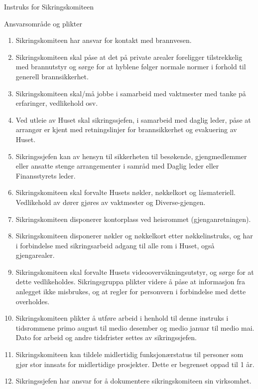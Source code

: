 \begin{instruks}{Instruks for Sikringskomiteen}{}{}
\begin{instruksledd}{Ansvarsområde og plikter}
\begin{enumerate}
            \item Sikringskomiteen har ansvar for kontakt med brannvesen.
            \item Sikringskomiteen skal påse at det på private arealer foreligger
                tilstrekkelig med brannutstyr og sørge for at
                hyblene følger normale normer i forhold til generell brannsikkerhet.
            \item Sikringskomiteen skal/må jobbe i samarbeid med vaktmester med tanke på
                erfaringer, vedlikehold osv.
            \item Ved utleie av Huset skal sikringssjefen, i samarbeid med daglig leder,
                påse at arrangør er kjent med
                retningslinjer for brannsikkerhet og evakuering av Huset.
            \item Sikringssjefen kan av hensyn til sikkerheten til besøkende,
                gjengmedlemmer eller ansatte stenge
                arrangementer i samråd med Daglig leder eller Finansstyrets leder.
            \item Sikringskomiteen skal forvalte Husets nøkler, nøkkelkort og låsmateriell.
                Vedlikehold av dører gjøres av
                vaktmester og Diverse-gjengen.
            \item Sikringskomiteen disponerer kontorplass ved heisrommet
                (gjenganretningen).
            \item Sikringskomiteen disponerer nøkler og nøkkelkort etter nøkkelinstruks,
                og har i forbindelse med
                sikringsarbeid adgang til alle rom i Huset, også gjengarealer.
            \item Sikringskomiteen skal forvalte Husets videoovervåkningsutstyr, og sørge
                for at dette vedlikeholdes.
                Sikringsgruppa plikter videre å påse at informasjon fra anlegget ikke
                misbrukes, og at regler for personvern i
                forbindelse med dette overholdes.
            \item Sikringskomiteen plikter å utføre arbeid i henhold til denne instruks i
                tidsrommene primo august til medio
                desember og medio januar til medio mai. Dato for arbeid og andre
                tidsfrister settes av sikringssjefen.
            \item Sikringskomiteen kan tildele midlertidig funksjonærstatus til personer
                som gjør stor innsats for midlertidige
                prosjekter. Dette er begrenset oppad til 1 år.
            \item Sikringssjefen har ansvar for å dokumentere sikringskomiteen sin
                virksomhet.
        \end{enumerate}
    \end{instruksledd}


\end{instruks}
